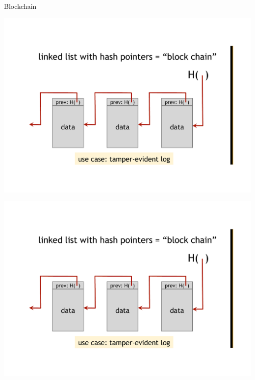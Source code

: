 \begin{frame}{Blockchain}
\begin{overprint}
\begin{center}
\includegraphics[width=\textwidth,page=3]{blockchain}
\end{center}
\begin{center}
\includegraphics[width=\textwidth,page=4]{blockchain}
\end{center}
\end{overprint}
	

\end{frame}

